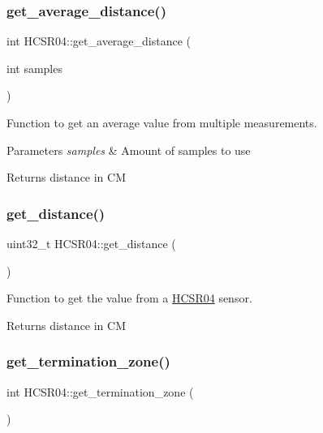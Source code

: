 \subsubsection{\texorpdfstring{get\+\_\+average\+\_\+distance()}{get\_average\_distance()}}
{\footnotesize\ttfamily int H\+C\+S\+R04\+::get\+\_\+average\+\_\+distance (\begin{DoxyParamCaption}\item[{int}]{samples }\end{DoxyParamCaption})}



Function to get an average value from multiple measurements. 


\begin{DoxyParams}{Parameters}
{\em samples} & Amount of samples to use \\
\hline
\end{DoxyParams}
\begin{DoxyReturn}{Returns}
distance in CM 
\end{DoxyReturn}
\mbox{\label{class_h_c_s_r04_a6f0e9830e49a9f482211890ca87e98c4}} 
\subsubsection{\texorpdfstring{get\+\_\+distance()}{get\_distance()}}
{\footnotesize\ttfamily uint32\+\_\+t H\+C\+S\+R04\+::get\+\_\+distance (\begin{DoxyParamCaption}{ }\end{DoxyParamCaption})}



Function to get the value from a \hyperlink{class_h_c_s_r04}{H\+C\+S\+R04} sensor. 

\begin{DoxyReturn}{Returns}
distance in CM 
\end{DoxyReturn}
\mbox{\label{class_h_c_s_r04_a0b796d03c8bfc551d5af8cb9b776c0f1}} 
\subsubsection{\texorpdfstring{get\+\_\+termination\+\_\+zone()}{get\_termination\_zone()}}
{\footnotesize\ttfamily int H\+C\+S\+R04\+::get\+\_\+termination\+\_\+zone (\begin{DoxyParamCaption}{ }\end{DoxyParamCaption})}



